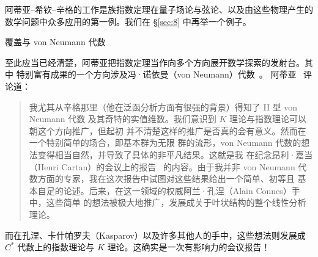 \documentclass[11pt]{amsart}
\makeatletter
\def\subsection{\@startsection{subsection}{2}%
   \z@{1.25\linespacing\@plus.7\linespacing}{.5\linespacing}%
   {\normalfont\bfseries}}
\theoremstyle{definition}
\theoremstyle{remark}
\theoremstyle{plain}
\numberwithin{equation}{section}
\renewcommand{\:}{\colon}
\newcommand{\ssA}{\mathfrak{A}}
\makeatother
\begin{document}
阿蒂亚–希钦–辛格的工作是族指数定理在量子场论与弦论、以及由这些物理产生的
数学问题中众多应用的第一例。我们在 \S\ref{sec:8} 中再举一个例子。


  \subsection{覆盖与 von Neumann 代数}\label{subsec:5.5}

至此应当已经清楚，阿蒂亚把指数定理当作向多个方向展开数学探索的发射台。其中
特别富有成果的一个方向涉及冯·诺依曼（von Neumann）代数~\cite{A5}。
阿蒂亚~\cite{A1} 评论道：

  \begin{quote}
 我尤其从辛格那里（他在泛函分析方面有很强的背景）得知了 II 型 von Neumann 代数
及其奇特的实值维数。我们意识到 $K$ 理论与指数理论可以朝这个方向推广，但起初
并不清楚这样的推广是否真的会有意义。然而在一个特别简单的场合，即基本群为无限
群的流形，von Neumann 代数的想法变得相当自然，并导致了具体的非平凡结果。这就是我
在纪念昂利·嘉当（Henri Cartan）的会议上的报告~\cite{A5} 的内容。由于我并非
von Neumann 代数方面的专家，我在这次报告中试图对这些结果给出一个简单、初等且
基本自足的论述。后来，在这一领域的权威阿兰·孔涅（Alain Connes）手中，这些简单
的想法被极大地推广，发展成关于叶状结构的整个线性分析理论。
  \end{quote}

\noindent 
而在孔涅、卡什帕罗夫（Kasparov）以及许多其他人的手中，这些想法则发展成
$C^*$ 代数上的指数理论与 $K$ 理论。这确实是一次有影响力的会议报告！
\end{document}
